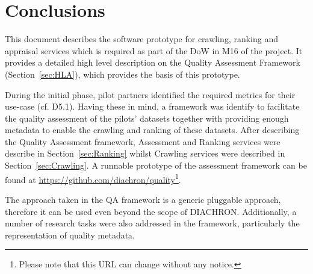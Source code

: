 
\section{Conclusions}
\label{sec:Conclusion} 

This document describes the software prototype for crawling, ranking and appraisal services which is required as part of the DoW in M16 of the project.
It provides a detailed high level description on the Quality Assessment Framework (Section~\ref{sec:HLA}), which provides the basis of this prototype.

During the initial phase, pilot partners identified the required metrics for their use-case (cf. D5.1).
Having these in mind, a framework was identify to facilitate the quality assessment of the pilots' datasets together with providing enough metadata to enable the crawling and ranking of these datasets.
After describing the Quality Assessment framework, Assessment and Ranking services were describe in Section~\ref{sec:Ranking} whilst Crawling services were described in Section~\ref{sec:Crawling}.
A runnable prototype of the assessment framework can be found at \url{https://github.com/diachron/quality}\footnote{Please note that this URL can change without any notice.}.

The approach taken in the QA framework is a generic pluggable approach, therefore it can be used even beyond the scope of DIACHRON.
Additionally, a number of research tasks were also addressed in the framework, particularly the representation of quality metadata.